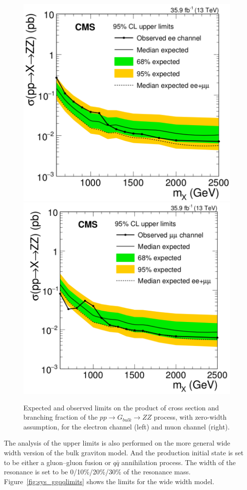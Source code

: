 \begin{figure}[htbp]
\begin{center}
\includegraphics[width=0.49\linewidth]{figures/sys_narrowlimitsel.png}
\includegraphics[width=0.49\linewidth]{figures/sys_narrowlimitsmu.png}
\caption{Expected and observed limits on the product of cross section and branching fraction of the $pp\rightarrow G_{bulk}\rightarrow ZZ$ process, with zero-width assumption, for the electron channel (left) and muon channel (right).}
\label{fig:sys_narrowlimitselmu}
\end{center}
\end{figure}

\vspace{0.3cm}
The analysis of the upper limits is also performed on the more general wide width version of the bulk graviton model. And the production initial state is set to be either a gluon–gluon fusion or $q\bar{q}$ annihilation process. The width of the resonance is set to be 0/10\%/20\%/30\% of the resonance mass. Figure~\ref{fig:sys_ggqqlimits} shows the limits for the wide width model.

